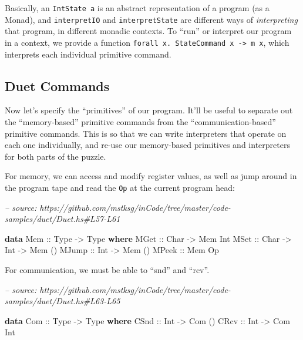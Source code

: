 \documentclass[]{article}
\newenvironment{Shaded}{}{}
\newcommand{\CommentTok}[1]{\textcolor[rgb]{0.38,0.63,0.69}{\textit{#1}}}
\newcommand{\DataTypeTok}[1]{\textcolor[rgb]{0.56,0.13,0.00}{#1}}
\newcommand{\KeywordTok}[1]{\textcolor[rgb]{0.00,0.44,0.13}{\textbf{#1}}}
\newcommand{\NormalTok}[1]{#1}
\newcommand{\OtherTok}[1]{\textcolor[rgb]{0.00,0.44,0.13}{#1}}
\begin{document}
Basically, an \texttt{IntState\ a} is an abstract representation of a program
(as a Monad), and \texttt{interpretIO} and \texttt{interpretState} are different
ways of \emph{interpreting} that program, in different monadic contexts. To
``run'' or interpret our program in a context, we provide a function
\texttt{forall\ x.\ StateCommand\ x\ -\textgreater{}\ m\ x}, which interprets
each individual primitive command.

\hypertarget{duet-commands}{%
\subsection{Duet Commands}\label{duet-commands}}

Now let's specify the ``primitives'' of our program. It'll be useful to separate
out the ``memory-based'' primitive commands from the ``communication-based''
primitive commands. This is so that we can write interpreters that operate on
each one individually, and re-use our memory-based primitives and interpreters
for both parts of the puzzle.

For memory, we can access and modify register values, as well as jump around in
the program tape and read the \texttt{Op} at the current program head:

\begin{Shaded}
\begin{Highlighting}[]
\CommentTok{-- source: https://github.com/mstksg/inCode/tree/master/code-samples/duet/Duet.hs#L57-L61}

\KeywordTok{data} \DataTypeTok{Mem}\OtherTok{ ::} \DataTypeTok{Type} \OtherTok{->} \DataTypeTok{Type} \KeywordTok{where}
    \DataTypeTok{MGet}\OtherTok{  ::} \DataTypeTok{Char} \OtherTok{->} \DataTypeTok{Mem} \DataTypeTok{Int}
    \DataTypeTok{MSet}\OtherTok{  ::} \DataTypeTok{Char} \OtherTok{->} \DataTypeTok{Int} \OtherTok{->} \DataTypeTok{Mem}\NormalTok{ ()}
    \DataTypeTok{MJump}\OtherTok{ ::} \DataTypeTok{Int}  \OtherTok{->} \DataTypeTok{Mem}\NormalTok{ ()}
    \DataTypeTok{MPeek}\OtherTok{ ::} \DataTypeTok{Mem} \DataTypeTok{Op}
\end{Highlighting}
\end{Shaded}

For communication, we must be able to ``snd'' and ``rcv''.

\begin{Shaded}
\begin{Highlighting}[]
\CommentTok{-- source: https://github.com/mstksg/inCode/tree/master/code-samples/duet/Duet.hs#L63-L65}

\KeywordTok{data} \DataTypeTok{Com}\OtherTok{ ::} \DataTypeTok{Type} \OtherTok{->} \DataTypeTok{Type} \KeywordTok{where}
    \DataTypeTok{CSnd}\OtherTok{ ::} \DataTypeTok{Int} \OtherTok{->} \DataTypeTok{Com}\NormalTok{ ()}
    \DataTypeTok{CRcv}\OtherTok{ ::} \DataTypeTok{Int} \OtherTok{->} \DataTypeTok{Com} \DataTypeTok{Int}
\end{Highlighting}
\end{Shaded}
\end{document}
